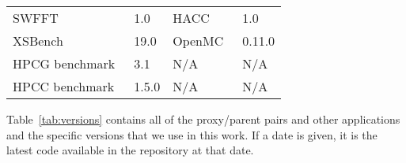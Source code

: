 \begin{table}[!t]
\begin{tabular}{ll|ll}
SWFFT~\cite{ECPProxySuite1}  & \cellcolor{Gray!50}1.0                & HACC~\cite{HACC}                & \cellcolor{Gray!50} 1.0                 \\
XSBench~\cite{XSBench}               & \cellcolor{Gray!50}19.0               & OpenMC~\cite{OpenMC}       & \cellcolor{Gray!50}0.11.0             \\
HPCG benchmark~\cite{hpcg}        &  \cellcolor{Gray!50}3.1                & N/A                                         &  \cellcolor{Gray!50}N/A                \\
HPCC benchmark~\cite{hpcc}        &  \cellcolor{Gray!50}1.5.0             & N/A                                          &  \cellcolor{Gray!50}N/A               \\
\bottomrule
\end{tabular}
\end{table}

Table~\ref{tab:versions} contains all of the proxy/parent pairs and other
applications and the specific versions that we use in this work. If a
date is given, it is the latest code available in the repository at
that date.

